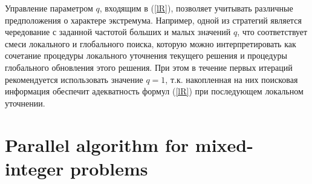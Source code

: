 \documentclass[
11pt,%
tightenlines,%
twoside,%
onecolumn,%
nofloats,%
nobibnotes,%
nofootinbib,%
superscriptaddress,%
noshowpacs,%
centertags]%
{revtex4}
\begin{document}
Управление параметром $q$, входящим в (\ref{lR}), позволяет учитывать различные предположения о характере экстремума. Например, одной из стратегий является чередование с заданной частотой больших и малых значений $q$, что соответствует смеси локального и глобального поиска, которую можно интерпретировать как сочетание процедуры локального уточнения текущего решения и процедуры глобального обновления этого решения. При этом в течение первых итераций рекомендуется использовать значение $q=1$, т.к. накопленная на них поисковая информация обеспечит адекватность формул (\ref{lR}) при последующем локальном уточнении.

%
%
%
%
%


\section{Parallel algorithm for mixed-integer problems}
\end{document}

